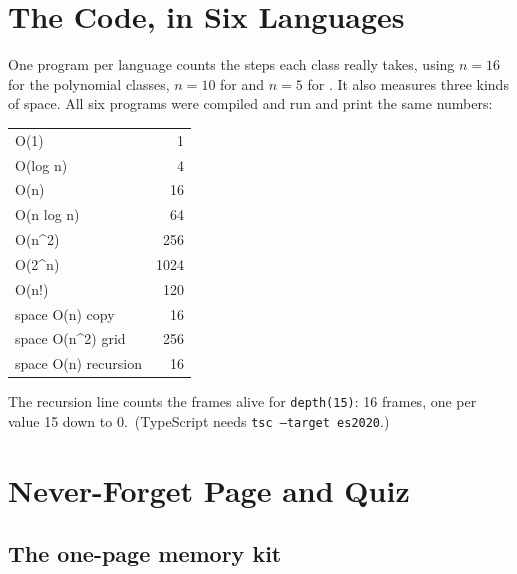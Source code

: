 \documentclass[11pt,a4paper]{article}
\newcommand{\Oexp}{\On{2\textsuperscript{n}}}
\newcommand{\Ofac}{\On{n!}}
\begin{document}
\section{The Code, in Six Languages}\label{s:code}

One program per language counts the steps each class really takes, using $n=16$ for the polynomial classes, $n=10$ for \Oexp{} and $n=5$ for \Ofac. It also measures three kinds of space. All six programs were compiled and run and print the same numbers:

\begin{center}
\ttfamily\small
\begin{tabular}{@{}l r@{}}
O(1) & 1\\ O(log n) & 4\\ O(n) & 16\\ O(n log n) & 64\\ O(n\^{}2) & 256\\ O(2\^{}n) & 1024\\ O(n!) & 120\\
space O(n) copy & 16\\ space O(n\^{}2) grid & 256\\ space O(n) recursion & 16\\
\end{tabular}
\end{center}
{\small\color{muted}The recursion line counts the frames alive for \texttt{depth(15)}: 16 frames, one per value 15 down to 0.\ (TypeScript needs \texttt{tsc --target es2020}.)}


\section{Never-Forget Page and Quiz}\label{s:quiz}

\subsection{The one-page memory kit}
\end{document}
